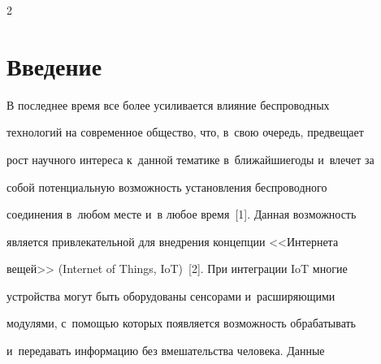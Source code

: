 






  













\thispagestyle{headings}





\begin{multicols}{2}





\label{st\stat}


    


  \section{Введение}


     


    В последнее время все более усиливается влияние беспроводных 


технологий на современное общество, что, в~свою очередь, предвещает 


рост научного интереса к~данной тематике в~ближайшие\linebreak годы и~влечет за 


собой потенциальную возможность установления беспроводного 


соединения в~любом месте и~в любое время~[1]. Данная возможность 


является привлекательной для внедрения концепции <<Интернета 


вещей>> (Internet of Things, IoT)~[2]. При интеграции IoT многие 


устройства могут быть оборудованы сенсорами и~расширяющими 


модулями, с~помощью которых появляется возможность обрабатывать 


и~передавать информацию без вмешательства человека. Данные 



\end{multicols}
